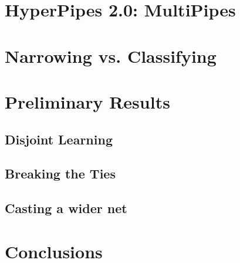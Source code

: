\documentclass{acm_proc_article-sp}
\begin{document}


\section{HyperPipes 2.0: MultiPipes}



\section{Narrowing vs. Classifying}



\section{Preliminary Results}

\subsection{Disjoint Learning}



\subsection{Breaking the Ties}





\subsection{Casting a wider net}



\section{Conclusions}





\balancecolumns
\end{document}
